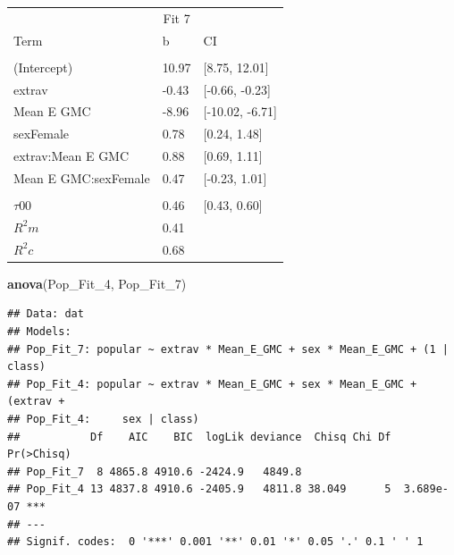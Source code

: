 \documentclass[]{article}
\newenvironment{Shaded}{\begin{snugshade}}{\end{snugshade}}
\newcommand{\KeywordTok}[1]{\textcolor[rgb]{0.13,0.29,0.53}{\textbf{#1}}}
\newcommand{\DecValTok}[1]{\textcolor[rgb]{0.00,0.00,0.81}{#1}}
\newcommand{\NormalTok}[1]{#1}
\begin{document}
\begin{tabular}{lll}
\toprule
\multicolumn{1}{c}{ } & \multicolumn{1}{c}{Fit 7} \\
\cmidrule(l{2pt}r{2pt}){2-2}
Term & b & CI\\
\midrule
\addlinespace[0.3em]
\multicolumn{3}{l}{\textbf{Fixed}}\\
\hspace{1em}(Intercept) & 10.97 & [8.75, 12.01]\\
\hspace{1em}extrav & -0.43 & [-0.66, -0.23]\\
\hspace{1em}Mean E GMC & -8.96 & [-10.02, -6.71]\\
\hspace{1em}sexFemale & 0.78 & [0.24, 1.48]\\
\hspace{1em}extrav:Mean E GMC & 0.88 & [0.69, 1.11]\\
\hspace{1em}Mean E GMC:sexFemale & 0.47 & [-0.23, 1.01]\\
\addlinespace[0.3em]
\multicolumn{3}{l}{\textbf{Random}}\\
\hspace{1em}$\tau {00}$ & 0.46 & [0.43, 0.60]\\
$R^2 m$ & 0.41 & \\
$R^2 c$ & 0.68 & \\
\bottomrule
\end{tabular}

\begin{Shaded}
\begin{Highlighting}[]
\KeywordTok{anova}\NormalTok{(Pop_Fit_}\DecValTok{4}\NormalTok{, Pop_Fit_}\DecValTok{7}\NormalTok{)}
\end{Highlighting}
\end{Shaded}

\begin{verbatim}
## Data: dat
## Models:
## Pop_Fit_7: popular ~ extrav * Mean_E_GMC + sex * Mean_E_GMC + (1 | class)
## Pop_Fit_4: popular ~ extrav * Mean_E_GMC + sex * Mean_E_GMC + (extrav + 
## Pop_Fit_4:     sex | class)
##           Df    AIC    BIC  logLik deviance  Chisq Chi Df Pr(>Chisq)    
## Pop_Fit_7  8 4865.8 4910.6 -2424.9   4849.8                             
## Pop_Fit_4 13 4837.8 4910.6 -2405.9   4811.8 38.049      5  3.689e-07 ***
## ---
## Signif. codes:  0 '***' 0.001 '**' 0.01 '*' 0.05 '.' 0.1 ' ' 1
\end{verbatim}
\end{document}
